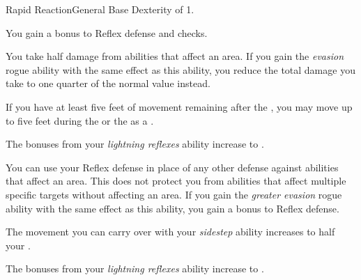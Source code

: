     \begin{feat}{Rapid Reaction}{General}
        \featpre Base Dexterity of 1.

         You gain a  bonus to Reflex defense and  checks.

         You take half damage from abilities that affect an area.
        If you gain the \textit{evasion} rogue ability with the same effect as this ability, you reduce the total damage you take to one quarter of the normal value instead.

         If you have at least five feet of movement remaining after the , you may move up to five feet during the  or the  as a .

         The bonuses from your \textit{lightning reflexes} ability increase to .

         You can use your Reflex defense in place of any other defense against abilities that affect an area.
        This does not protect you from abilities that affect multiple specific targets without affecting an area.
        If you gain the \textit{greater evasion} rogue ability with the same effect as this ability, you gain a  bonus to Reflex defense.

         The movement you can carry over with your \textit{sidestep} ability increases to half your .

         The bonuses from your \textit{lightning reflexes} ability increase to .
    \end{feat}

